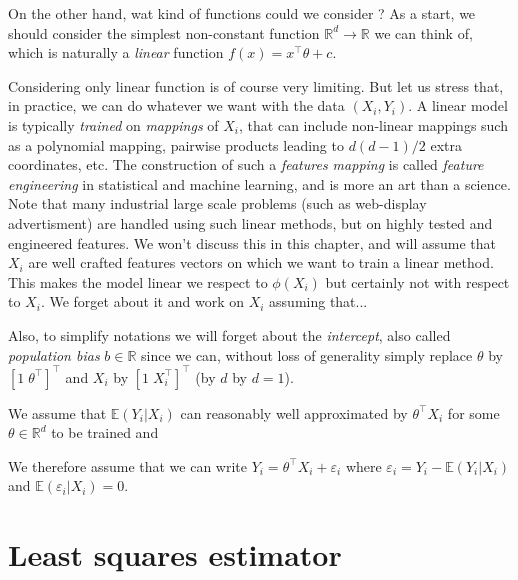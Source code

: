 \documentclass[
	fontsize=11pt, %
	twoside=false, %
	numbers=noenddot, %
]{kaobook}
\newcommand{\eps}{\varepsilon}
\newcommand{\E}{\mathbb E}
\newcommand{\R}{\mathbb R}
\newcommand{\go}{\rightarrow}
\begin{document}
On the other hand, wat kind of functions could we consider ?
As a start, we should consider the simplest non-constant function $\R^d \go \R$ we can think of, which is naturally a \emph{linear} function $f(x) = x^\top \theta + c$.

\begin{kaobox}[frametitle=Features engineering]
	Considering only linear function is of course very limiting. But let us stress that, in practice, we can do whatever we want with the data $(X_i, Y_i)$. A linear model is typically \emph{trained} on \emph{mappings} of $X_i$, that can include non-linear mappings such as a polynomial mapping, pairwise products leading to $d(d-1)/2$ extra coordinates, etc. The construction of such a \emph{features mapping} is called \emph{feature engineering} in statistical and machine learning, and is more an art than a science. Note that many industrial large scale problems (such as web-display advertisment) are handled using such linear methods, but on highly tested and engineered features. We won't discuss this in this chapter, and will assume that $X_i$ are well crafted features vectors on which we want to train a linear method.	
	This makes the model linear we respect to $\phi(X_i)$ but certainly not with respect to $X_i$.
	We forget about it and work on $X_i$ assuming that...
\end{kaobox}

Also, to simplify notations we will forget about the \emph{intercept}, also called \emph{population bias} $b \in \R$ since we can, without loss of generality simply replace $\theta$ by $[1 \; \theta^\top]^\top$ and $X_i$ by $[1 \; X_i^\top]^\top$ (by $d$ by $d=1$).

We assume that $\E(Y_i | X_i)$ can reasonably well approximated by $\theta^\top X_i$ for some $\theta \in \R^d$ to be trained and 

We therefore assume that we can write $Y_i = \theta^\top X_i + \eps_i$ where $\eps_i = Y_i - \E(Y_i | X_i)$ and $\E(\eps_i | X_i) = 0$.



\section{Least squares estimator} %
\label{sec:least_squares_estimator}
\end{document}
